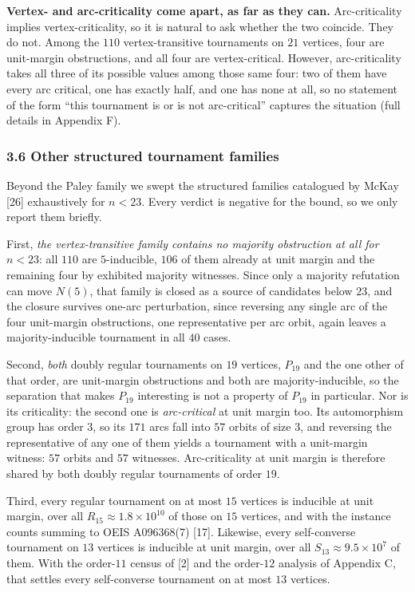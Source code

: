 \documentclass[
]{article}
\newcounter{none} %
\begin{document}
\textbf{Vertex- and arc-criticality come apart, as far as they can.}
Arc-criticality implies vertex-criticality, so it is natural to ask
whether the two coincide. They do not. Among the \(110\)
vertex-transitive tournaments on \(21\) vertices, four are unit-margin
obstructions, and all four are vertex-critical. However, arc-criticality
takes all three of its possible values among those same four: two of
them have every arc critical, one has exactly half, and one has none at
all, so no statement of the form ``this tournament is or is not
arc-critical'' captures the situation (full details in Appendix F).

\subsubsection{3.6 Other structured tournament
families}\label{other-structured-tournament-families}

Beyond the Paley family we swept the structured families catalogued by
McKay {[}26{]} exhaustively for \(n < 23\). Every verdict is negative
for the bound, so we only report them briefly.

First, \emph{the vertex-transitive family contains no majority
obstruction at all for \(n < 23\)}: all \(110\) are \(5\)-inducible,
\(106\) of them already at unit margin and the remaining four by
exhibited majority witnesses. Since only a majority refutation can move
\(N(5)\), that family is closed as a source of candidates below \(23\),
and the closure survives one-arc perturbation, since reversing any
single arc of the four unit-margin obstructions, one representative per
arc orbit, again leaves a majority-inducible tournament in all \(40\)
cases.

Second, \emph{both} doubly regular tournaments on \(19\) vertices,
\(P_{19}\) and the one other of that order, are unit-margin obstructions
and both are majority-inducible, so the separation that makes \(P_{19}\)
interesting is not a property of \(P_{19}\) in particular. Nor is its
criticality: the second one is \emph{arc-critical} at unit margin too.
Its automorphism group has order \(3\), so its \(171\) arcs fall into
\(57\) orbits of size \(3\), and reversing the representative of any one
of them yields a tournament with a unit-margin witness: \(57\) orbits
and \(57\) witnesses. Arc-criticality at unit margin is therefore shared
by both doubly regular tournaments of order \(19\).

Third, every regular tournament on at most \(15\) vertices is inducible
at unit margin, over all \(R_{15} \approx 1.8 \times 10^{10}\) of those
on \(15\) vertices, and with the instance counts summing to OEIS
A096368(7) {[}17{]}. Likewise, every self-converse tournament on \(13\)
vertices is inducible at unit margin, over all
\(S_{13} \approx 9.5 \times 10^{7}\) of them. With the order-\(11\)
census of {[}2{]} and the order-\(12\) analysis of Appendix C, that
settles every self-converse tournament on at most \(13\) vertices.
\end{document}
